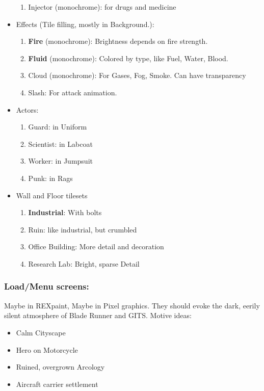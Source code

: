 \documentclass[11pt,a4paper, twocolumn]{article}
\begin{document}
\begin{itemize}
\begin{enumerate}
                    \item Injector (monochrome): for drugs and medicine
                \end{enumerate}
            \item Effects (Tile filling, mostly in Background.):
                \begin{enumerate}
                    \item \textbf{Fire} (monochrome): Brightness depends on fire strength.
                    \item \textbf{Fluid} (monochrome): Colored by type, like Fuel, Water, Blood.
                    \item Cloud (monochrome): For Gases, Fog, Smoke. Can have transparency
                    \item Slash: For attack animation.
                \end{enumerate}
            \item Actors:
                \begin{enumerate}
                    \item Guard: in Uniform
                    \item Scientist: in Labcoat
                    \item Worker: in Jumpsuit
                    \item Punk: in Rags
                \end{enumerate}
            \item Wall and Floor tilesets
                \begin{enumerate}
                    \item \textbf{Industrial}: With bolts
                    \item Ruin: like industrial, but crumbled
                    \item Office Building: More detail and decoration
                    \item Research Lab: Bright, sparse Detail
                \end{enumerate}
        \end{itemize}

\subsubsection*{Load/Menu screens:} Maybe in REXpaint, Maybe in Pixel graphics. They should evoke the dark, eerily
            silent atmosphere of Blade Runner and GITS. Motive ideas:
    \begin{itemize}
        \item Calm Cityscape
        \item Hero on Motorcycle
        \item Ruined, overgrown Arcology
        \item Aircraft carrier settlement
    \end{itemize}
\end{document}

